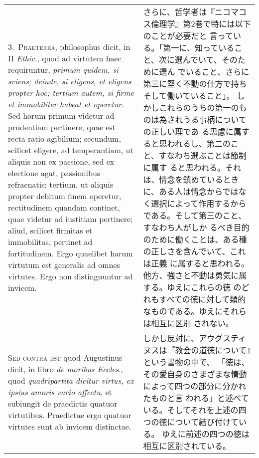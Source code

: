 \documentclass[10pt]{jsarticle}
\begin{document}
\begin{longtable}{p{21em}p{21em}}
 
\\



3.~{\scshape Praeterea}, philosophus dicit, in II {\itshape Ethic}.,
quod ad virtutem haec requiruntur, {\itshape primum quidem, si sciens;
deinde, si eligens, et eligens propter hoc; tertium autem, si firme et
immobiliter habeat et operetur}. Sed horum primum videtur ad
prudentiam pertinere, quae est recta ratio agibilium; secundum,
scilicet eligere, ad temperantiam, ut aliquis non ex passione, sed ex
electione agat, passionibus refraenatis; tertium, ut aliquis propter
debitum finem operetur, rectitudinem quandam continet, quae videtur ad
iustitiam pertinere; aliud, scilicet firmitas et immobilitas, pertinet
ad fortitudinem. Ergo quaelibet harum virtutum est generalis ad omnes
virtutes. Ergo non distinguuntur ad invicem.


&

 さらに、哲学者は『ニコマコス倫理学』第2巻で特には以下のことが必要だと
 言っている。「第一に、知っていること、次に選んでいて、そのために選ん
 でいること、さらに第三に堅く不動の仕方で持ちそして働いていること」。
 しかしこれらのうちの第一のものは為されうる事柄についての正しい理であ
 る思慮に属すると思われるし、第二のこと、すなわち選ぶことは節制に属す
 ると思われる。それは、情念を鎮めているときに、ある人は情念からではな
 く選択によって作用するからである。そして第三のこと、すなわち人がしか
 るべき目的のために働くことは、ある種の正しさを含んでいて、これは正義
 に属すると思われる。他方、強さと不動は勇気に属する。ゆえにこれらの徳
 のどれもすべての徳に対して類的なものである。ゆえにそれらは相互に区別
 されない。
 
 
\\



{\scshape Sed contra est} quod Augustinus dicit, in libro {\itshape de
moribus Eccles}., quod {\itshape quadripartita dicitur virtus, ex
ipsius amoris vario affectu}, et subiungit de praedictis quatuor
virtutibus. Praedictae ergo quatuor virtutes sunt ab invicem
distinctae.


&

しかし反対に、アウグスティヌスは『教会の道徳について』という書物の中で、
「徳は、その愛自身のさまざまな情動によって四つの部分に分かれたものと言
われる」と述べている。そしてそれを上述の四つの徳について結び付けている。
ゆえに前述の四つの徳は相互に区別されている。
 
\\




\end{longtable}
\end{document}
